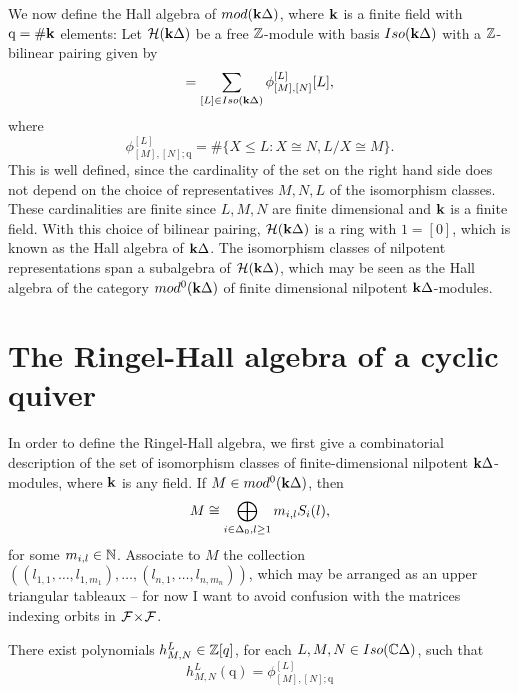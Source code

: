 \documentclass[a4paper, 11pt]{report}
\begin{document}
We now define the Hall algebra of $mod(\mathbf{k}\Delta)$, where $\mathbf{k}$ is a finite field with $\mathrm{q} = \#\mathbf{k}$ elements:
Let $\mathcal{H}(\mathbf{k}\Delta)$ be a free $\mathbb{Z}$-module with basis $Iso(\mathbf{k}\Delta)$ with a $\mathbb{Z}$-bilinear pairing given by
\begin{equation*}
[M][N] = \sum_{[L]\in Iso(\field\cyclic)} \phi_{[M],[N]}^{[L]} [L],
\end{equation*}
where
\begin{equation*}
\phi_{[M],[N];\mathrm{q}}^{[L]} = \#\{X\le L: X\cong N, L/X\cong M\}.
\end{equation*}
This is well defined, since the cardinality of the set on the right hand side does not depend on the choice of representatives $M,N,L$ of the isomorphism classes. These cardinalities are finite since $L,M,N$ are finite dimensional and $\mathbf{k}$ is a finite field. With this choice of bilinear pairing, $\mathcal{H}(\mathbf{k}\Delta)$ is a ring with $1 = [0]$, which is known as the Hall algebra of $\mathbf{k}\Delta$. The isomorphism classes of nilpotent representations span a subalgebra of $\mathcal{H}(\mathbf{k}\Delta)$, which may be seen as the Hall algebra of the category $mod^0(\mathbf{k}\Delta)$ of finite dimensional nilpotent $\mathbf{k}\Delta$-modules.

\section{The Ringel-Hall algebra of a cyclic quiver}

In order to define the Ringel-Hall algebra, we first give a combinatorial description of the set of isomorphism classes of finite-dimensional nilpotent $\mathbf{k}\Delta$-modules, where $\mathbf{k}$ is any field. If $M\in mod^0(\mathbf{k}\Delta)$, then
\begin{equation*}
M\cong\bigoplus_{i\in\Delta_0, l\geq 1} m_{i,l}S_i(l),
\end{equation*}
for some $m_{i,l}\in\mathbb{N}$. Associate to $M$ the collection $((l_{1,1},\ldots, l_{1,m_1}),\ldots ,(l_{n,1},\ldots,l_{n,m_n}))$, which may be arranged as an upper triangular tableaux -- for now I want to avoid confusion with the matrices indexing orbits in ${\mathcal{F}\!\times\!\mathcal{F}}$.

There exist polynomials $h_{M,N}^L\in\mathbb{Z}[q]$, for each $L,M,N\in Iso(\mathbb{C}\Delta)$, such that
\begin{equation*}
h_{M,N}^L(\mathrm{q}) = \phi_{[M],[N];\mathrm{q}}^{[L]}
\end{equation*}
\end{document}

